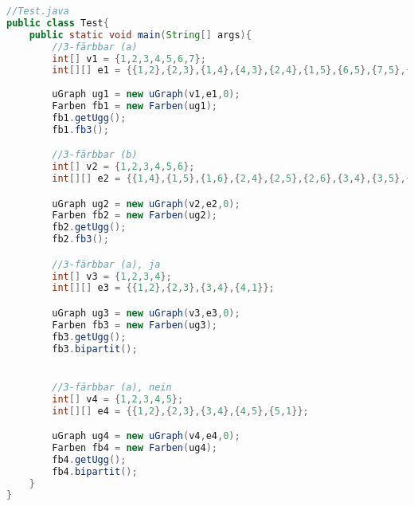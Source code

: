\begin{lstlisting}[language = java]
//Test.java
public class Test{
    public static void main(String[] args){
        //3-färbbar (a)
        int[] v1 = {1,2,3,4,5,6,7};
        int[][] e1 = {{1,2},{2,3},{1,4},{4,3},{2,4},{1,5},{6,5},{7,5},{5,4}};
        
        uGraph ug1 = new uGraph(v1,e1,0);
        Farben fb1 = new Farben(ug1);
        fb1.getUgg();
        fb1.fb3();

        //3-färbbar (b)
        int[] v2 = {1,2,3,4,5,6};
        int[][] e2 = {{1,4},{1,5},{1,6},{2,4},{2,5},{2,6},{3,4},{3,5},{3,6}};

        uGraph ug2 = new uGraph(v2,e2,0);
        Farben fb2 = new Farben(ug2);
        fb2.getUgg();
        fb2.fb3();

        //3-färbbar (a), ja
        int[] v3 = {1,2,3,4};
        int[][] e3 = {{1,2},{2,3},{3,4},{4,1}};

        uGraph ug3 = new uGraph(v3,e3,0);
        Farben fb3 = new Farben(ug3);
        fb3.getUgg();
        fb3.bipartit();


        //3-färbbar (a), nein
        int[] v4 = {1,2,3,4,5};
        int[][] e4 = {{1,2},{2,3},{3,4},{4,5},{5,1}};

        uGraph ug4 = new uGraph(v4,e4,0);
        Farben fb4 = new Farben(ug4);
        fb4.getUgg();
        fb4.bipartit();
    }
}
\end{lstlisting}
